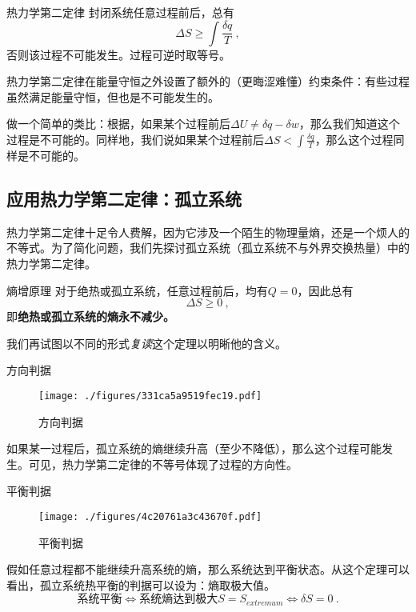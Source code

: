 \begin{theorem}{热力学第二定律}
封闭系统任意过程前后，总有
\begin{equation}
\Delta S \ge \int \frac{\delta q}{T}~,
\end{equation}
否则该过程不可能发生。过程可逆时取等号。
\end{theorem}
热力学第二定律在能量守恒之外设置了额外的（更晦涩难懂）约束条件：有些过程虽然满足能量守恒，但也是不可能发生的。

做一个简单的类比：根据，如果某个过程前后$\Delta U \ne \delta q - \delta w$，那么我们知道这个过程是不可能的。同样地，我们说如果某个过程前后$\Delta S < \int \frac{\delta q}{T}$，那么这个过程同样是不可能的。

\subsection{应用热力学第二定律：孤立系统}
热力学第二定律十足令人费解，因为它涉及一个陌生的物理量熵，还是一个烦人的不等式。为了简化问题，我们先探讨孤立系统（孤立系统不与外界交换热量）中的热力学第二定律。
\begin{corollary}{熵增原理}
对于绝热或孤立系统，任意过程前后，均有$Q=0$，因此总有 $$\Delta S \ge 0~,$$
即\textbf{绝热或孤立系统的熵永不减少。}
\end{corollary}
我们再试图以不同的形式\textsl{复读}这个定理以明晰他的含义。

\begin{corollary}{方向判据}
\begin{figure}[ht]
\centering
\texttt{[image: ./figures/331ca5a9519fec19.pdf]}
\caption{方向判据} \label{fig_Td2Law_1}
\end{figure}
如果某一过程后，孤立系统的熵继续升高（至少不降低），那么这个过程可能发生。可见，热力学第二定律的不等号体现了过程的方向性。
\end{corollary}

\begin{corollary}{平衡判据}
\begin{figure}[ht]
\centering
\texttt{[image: ./figures/4c20761a3c43670f.pdf]}
\caption{平衡判据} \label{fig_Td2Law_2}
\end{figure}
假如任意过程都不能继续升高系统的熵，那么系统达到平衡状态。从这个定理可以看出，孤立系统热平衡的判据可以设为：熵取极大值。
$$\text{系统平衡} \Leftrightarrow \text{系统熵达到极大} S=S_{extremum} \Leftrightarrow \delta S = 0~.$$
\end{corollary}

